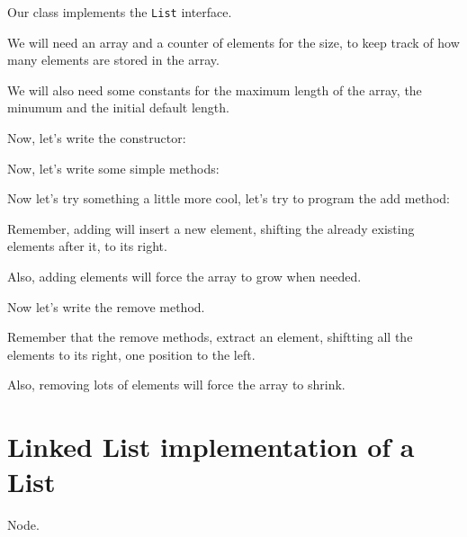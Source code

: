 \documentclass[a4paper, 9pt]{extarticle}
\begin{document}
Our class implements the \verb+List+ interface.

We will need an array and a counter of elements for the size, to keep track of
how many elements are stored in the array.

We will also need some constants for the maximum length of the array, the
minumum and the initial default length.

Now, let's write the constructor:


Now, let's write some simple methods:




Now let's try something a little more cool, let's try to program the add method:

Remember, adding will insert a new element, shifting the already existing elements after it, to its right.

Also, adding elements will force the array to grow when needed.




Now let's write the remove method.

Remember that the remove methods, extract an element, shiftting all the elements to its right, one position to the left.

Also, removing lots of elements will force the array to shrink.









\section{Linked List implementation of a List}

Node.
\end{document}
